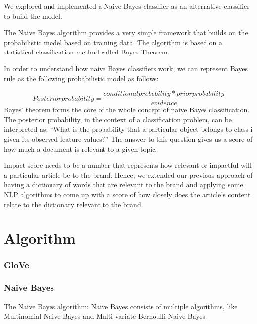 \documentclass{article}
\begin{document}
We explored and implemented a Naive Bayes classifier as an alternative classifier to build the model.

The Naive Bayes algorithm provides a very simple framework that builds on the probabilistic model based on training data.
The algorithm is based on a statistical classification method called Bayes Theorem.

In order to understand how naive Bayes classifiers work, we can represent Bayes rule as the following probabilistic model as follows:

\[Posteriorprobability = \frac{conditionalprobability * priorprobability}{evidence}\]
Bayes’ theorem forms the core of the whole concept of naive Bayes classification. The posterior probability, in the context of a classification problem, can be interpreted as: “What is the probability that a particular object belongs to class i given its observed feature values?” The answer to this question gives us a score of how much a document is relevant to a given topic.


Impact score needs to be a number that represents how relevant or impactful will a particular article be to the brand. Hence, we extended our previous approach of having a dictionary of words that are relevant to the brand and applying some NLP algorithms to come up with a score of how closely does the article's content relate to the dictionary relevant to the brand.

\maketitle
\section {Algorithm}

\subsubsection {GloVe}

\subsubsection {Naive Bayes}
The Naive Bayes algorithm:
Naive Bayes consists of multiple algorithms, like Multinomial Naive Bayes and Multi-variate Bernoulli Naive Bayes.
\end{document}
